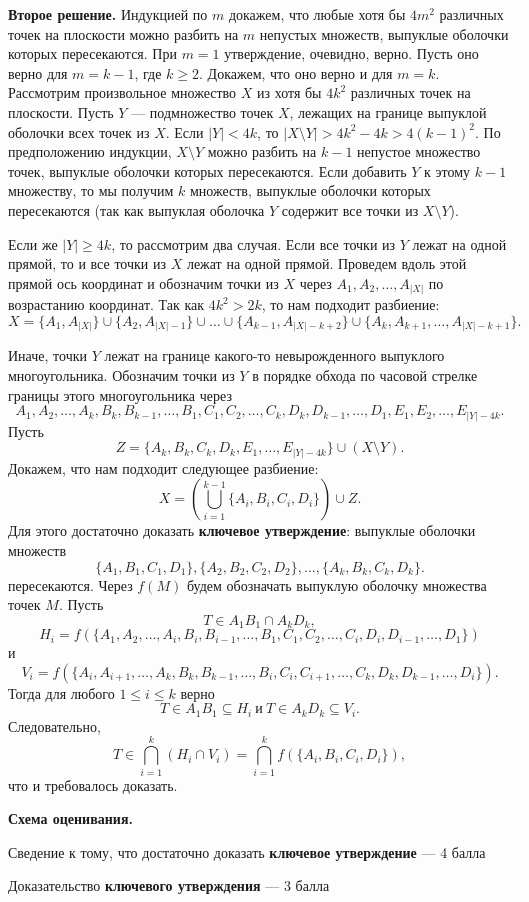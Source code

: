 \documentclass[12pt]{article}
\def\solII{\par \noindent \textbf{Второе решение. }}
\begin{document}
\bigskip

\solII Индукцией по $m$ докажем, что любые хотя бы $4m^2$ различных точек на плоскости можно разбить на $m$ непустых множеств, выпуклые оболочки которых пересекаются. При $m = 1$ утверждение, очевидно, верно. Пусть оно верно для $m = k - 1$, где $k \geq 2$. Докажем, что оно верно и для $m = k$. Рассмотрим произвольное множество $X$ из хотя бы $4k^2$ различных точек на плоскости. Пусть $Y$ --- подмножество точек $X$, лежащих на границе выпуклой оболочки всех точек из $X$. Если $|Y| < 4k$, то $|X \setminus Y| > 4k^2 - 4k > 4(k-1)^2$. По предположению индукции, $X \setminus Y$ можно разбить на $k - 1$ непустое множество точек, выпуклые оболочки которых пересекаются. Если добавить $Y$ к этому $k - 1$ множеству, то мы получим $k$ множеств, выпуклые оболочки которых пересекаются (так как выпуклая оболочка $Y$ содержит все точки из $X \setminus Y$).

Если же $|Y| \geq 4k$, то рассмотрим два случая. Если все точки из $Y$ лежат на одной прямой, то и все точки из $X$ лежат на одной прямой. Проведем вдоль этой прямой ось координат и обозначим точки из $X$ через $A_1, A_2, \ldots, A_{|X|}$ по возрастанию координат. Так как $4k^2 > 2k$, то нам подходит разбиение: 
\[X = \{A_1, A_{|X|}\} \cup \{A_2, A_{|X|-1}\} \cup \ldots \cup \{A_{k-1}, A_{|X|-k+2}\} \cup \{A_k, A_{k+1}, \ldots, A_{|X|-k+1}\}.\]

Иначе, точки $Y$ лежат на границе какого-то невырожденного выпуклого многоугольника. Обозначим точки из $Y$ в порядке обхода по часовой стрелке границы этого многоугольника через 
\[A_1, A_2, \ldots, A_k, B_k, B_{k-1}, \ldots, B_1, C_1, C_2, \ldots, C_k, D_k, D_{k-1}, \ldots, D_1, E_1, E_2, \ldots, E_{|Y| - 4k}.\]
Пусть 
\[Z = \{A_k, B_k, C_k, D_k, E_1, \ldots, E_{|Y| - 4k}\} \cup (X \setminus Y).\]
Докажем, что нам подходит следующее разбиение:
\[X = \left(\bigcup_{i=1}^{k-1} \{A_i, B_i, C_i, D_i\}\right) \cup Z.\]
Для этого достаточно доказать \textbf{ключевое утверждение}: выпуклые оболочки множеств
\[\{A_1, B_1, C_1, D_1\}, \{A_2, B_2, C_2, D_2\}, \ldots, \{A_k, B_k, C_k, D_k\}.\]
пересекаются. Через $f(M)$ будем обозначать выпуклую оболочку множества точек $M$. Пусть
\[T \in A_1B_1 \cap A_kD_k,\]
\[H_i = f(\{A_1, A_2, \ldots, A_i, B_i, B_{i-1}, \ldots, B_1, C_1, C_2, \ldots, C_i, D_i, D_{i-1}, \ldots, D_1\})\]
и
\[V_i = f(\{A_i, A_{i+1}, \ldots, A_k, B_k, B_{k-1}, \ldots, B_i, C_i, C_{i+1}, \ldots, C_k, D_k, D_{k-1}, \ldots, D_i\}).\]
Тогда для любого $1 \leq i \leq k$ верно
\[T \in A_1B_1 \subseteq H_i \ \text{и} \ T \in A_kD_k \subseteq V_i.\]
Следовательно,
\[T \in \bigcap_{i=1}^{k} (H_i \cap V_i) = \bigcap_{i=1}^{k} f(\{A_i, B_i, C_i, D_i\}),\]
что и требовалось доказать.

\bigskip

\textbf{Схема оценивания.}
\begin{compactitem}
\item Сведение к тому, что достаточно доказать \textbf{ключевое утверждение} --- 4 балла
\item Доказательство \textbf{ключевого утверждения} --- 3 балла
\end{compactitem}

\bigskip
\end{document}
